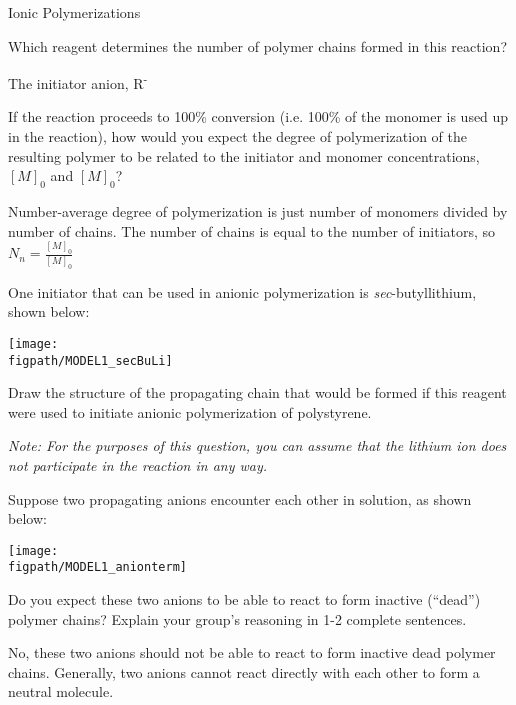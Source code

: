 \begin{activity}{Ionic Polymerizations}
\begin{ctqs}
	
	\question Which reagent determines the number of polymer chains formed in this reaction?
	
		\begin{solution}[0.25in]
			The initiator anion, R\textsuperscript{-}
		\end{solution}
	
	\question If the reaction proceeds to 100\% conversion (i.e. 100\% of the monomer is used up in the reaction), how would you expect the degree of polymerization of the resulting polymer to be related to the initiator and monomer concentrations, $[M]_0$ and $[M]_0$?
	
		\begin{solution}[0.5in]
			Number-average degree of polymerization is just number of monomers divided by number of chains.  The number of chains is equal to the number of initiators, so $N_n = \frac{[M]_0}{[M]_0}$
		\end{solution}
	
	\question One initiator that can be used in anionic polymerization is \emph{sec}-butyllithium, shown below:
	 \label{\labelbase:ctq:ps-anionic-prop}
	
	\centerline{\texttt{[image: \\figpath/MODEL1\_secBuLi]}}
	 	
	 	Draw the structure of the propagating chain that would be formed if this reagent were used to initiate anionic polymerization of polystyrene.
	 	
	 	\emph{Note: For the purposes of this question, you can assume that the lithium ion does not participate in the reaction in any way.}
	
		\begin{solution}[1in]
		\studentdisplay{}
		\end{solution}
	
	\question Suppose two propagating anions encounter each other in solution, as shown below:
	
	\centerline{\texttt{[image: \\figpath/MODEL1\_anionterm]}}
	
		Do you expect these two anions to be able to react to form inactive (``dead'') polymer chains?  Explain your group's reasoning in 1-2 complete sentences.
	
		\begin{solution}[1.25in]
			No, these two anions should not be able to react to form inactive dead polymer chains.  Generally, two anions cannot react directly with each other to form a neutral molecule.
		\end{solution}
	

\end{ctqs}
\end{activity}
